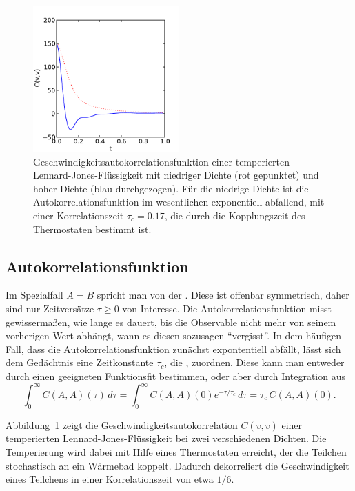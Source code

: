 \begin{figure}
  \centering
  \includegraphics[width=0.5\textwidth]{plots/v_ac}
  \caption{Geschwindigkeitsautokorrelationsfunktion einer temperierten
    Lennard-Jones-Flüs\-sig\-ke\-it mit niedriger Dichte (rot
    gepunktet) und hoher Dichte (blau durchgezogen). Für die niedrige
    Dichte ist die Autokorrelationsfunktion im wesentlichen
    exponentiell abfallend, mit einer Korrelationszeit $\tau_c=0.17$,
    die durch die Kopplungszeit des Thermostaten bestimmt ist.}
  \label{fig:vac}
\end{figure}

\subsection{Autokorrelationsfunktion}

Im Spezialfall $A=B$ spricht man von der
\emph{}. Diese ist offenbar
symmetrisch, daher sind nur Zeitversätze $\tau\ge 0$ von
Interesse. Die Autokorrelationsfunktion misst gewissermaßen, wie lange
es dauert, bis die Observable nicht mehr von seinem vorherigen Wert
abhängt, wann es diesen sozusagen "`vergisst"'. In dem häufigen Fall,
dass die Autokorrelationsfunktion zunächst expontentiell abfällt,
lässt sich dem Gedächtnis eine Zeitkonstante $\tau_c$, die
\emph{}, zuordnen. Diese kann man entweder
durch einen geeigneten Funktionsfit bestimmen, oder aber durch
Integration aus
\begin{equation}
  \label{eq:tauc}
  \int_{0}^{\infty} C(A,A)(\tau)\,d\tau = \int_{0}^{\infty}
  C(A,A)(0)e^{-\tau/\tau_c}\,d\tau = \tau_c\,C(A,A)(0).
\end{equation}

Abbildung~\ref{fig:vac} zeigt die Geschwindigkeitsautokorrelation
$C(v,v)$ einer temperierten Lennard-Jones-Flüs\-sig\-ke\-it bei zwei
verschiedenen Dichten. Die Temperierung wird dabei mit Hilfe eines
Thermostaten erreicht, der die Teilchen stochastisch an ein Wärmebad
koppelt. Dadurch dekorreliert die Geschwindigkeit eines Teilchens in
einer Korrelationszeit von etwa $1/6$.

